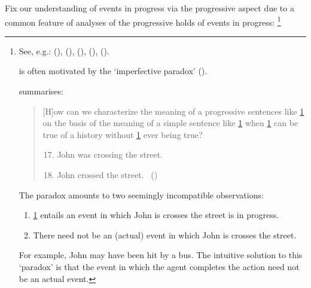 \begin{note}
  Fix our understanding of events in progress via the progressive aspect due to a common feature of analyses of the progressive holds of events in progress:%
  \footnote{
    See, e.g.:
    (\cite{Bennett:1972uw}),
    (\cite{Dowty:1979vq}),
    (\cite{Parsons:1990aa}),
    (\cite{Landman:1992wh}),
    (\cite{Portner:1998um}).

    \assuPP{} is often motivated by the `imperfective paradox' (\cite[cf.][Ch.3.1]{Dowty:1979vq}).

    \citeauthor{Bach:1986tb} summarises:
    \begin{quote}
      [H]ow can we characterize the meaning of a progressive sentences like \ref{Bach:impP:17} on the basis of the meaning of a simple sentence like \ref{Bach:impP:18} when \ref{Bach:impP:17} can be true of a history without \ref{Bach:impP:18} ever being true?
      \begin{enumerate}[label=(\arabic*), ref=(\arabic*)]
        \setcounter{enumi}{16}
      \item
        \label{Bach:impP:17}
        John was crossing the street.
      \item
        \label{Bach:impP:18}
        John crossed the street.%
        \mbox{ }\hfill\mbox{(\citeyear[12]{Bach:1986tb})}
      \end{enumerate}
    \end{quote}
    The paradox amounts to two seemingly incompatible observations:
    \begin{enumerate}[noitemsep]
    \item
      \ref{Bach:impP:17} entails an event in which John is crosses the street is in progress.
    \item
      There need not be an (actual) event in which John is crosses the street.%
    \end{enumerate}
    For example, John may have been hit by a bus.
    The intuitive solution to this `paradox' is that the event in which the agent completes the action need not be an actual event.
  }


\end{note}
